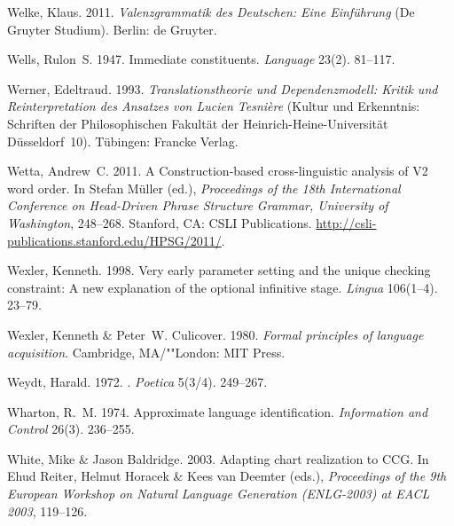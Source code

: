 \begin{thebibliography}{1420}
Welke, Klaus. 2011.
\newblock \emph{{Valenzgrammatik des Deutschen: Eine Einf{\"u}hrung}}  (De
  Gruyter Studium).
\newblock Berlin: de Gruyter.

Wells, Rulon~S. 1947.
\newblock Immediate constituents.
\newblock \emph{Language} 23(2). 81--117.

Werner, Edeltraud. 1993.
\newblock \emph{{Translationstheorie und Dependenzmodell: Kritik und
  Reinterpretation des Ansatzes von Lucien Tesni{\`e}re}} ({Kultur und
  Erkenntnis: Schriften der Philosophischen Fakult{\"a}t der
  Heinrich-Heine-Universit{\"a}t D{\"u}sseldorf}~10).
\newblock T\"u\-bing\-en: Francke Verlag.

Wetta, Andrew~C. 2011.
\newblock A {Construction}-based cross-linguistic analysis of {V2} word order.
\newblock In Stefan M{\"u}ller (ed.), \emph{Proceedings of the {18th
  International Conference on Head-Driven Phrase Structure Grammar, University
  of Washington}}, 248--268. Stanford, CA: CSLI Publications.
\newblock \urlprefix\url{http://csli-publications.stanford.edu/HPSG/2011/}.

Wexler, Kenneth. 1998.
\newblock Very early parameter setting and the unique checking constraint: {A}
  new explanation of the optional infinitive stage.
\newblock \emph{Lingua} 106(1--4). 23--79.

Wexler, Kenneth \& Peter~W. Culicover. 1980.
\newblock \emph{Formal principles of language acquisition}.
\newblock Cambridge, MA/""London: MIT Press.

Weydt, Harald. 1972.
.
\newblock \emph{Poetica} 5(3/4). 249--267.

Wharton, R.~M. 1974.
\newblock Approximate language identification.
\newblock \emph{Information and Control} 26(3). 236--255.

White, Mike \& Jason Baldridge. 2003.
\newblock Adapting chart realization to {CCG}.
\newblock In Ehud Reiter, Helmut Horacek \& Kees van Deemter (eds.),
  \emph{Proceedings of the 9th {European Workshop on Natural Language
  Generation (ENLG-2003) at EACL 2003}}, 119--126.


\end{thebibliography}

